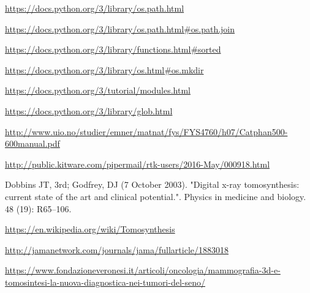 \documentclass[a4paper,12pt, doubleside]{report}
\begin{document}
\begin{thebibliography}{1}
        \url{https://docs.python.org/3/library/os.path.html}

        \url{https://docs.python.org/3/library/os.path.html#os.path.join}

        \url{https://docs.python.org/3/library/functions.html#sorted}    
        
        \url{https://docs.python.org/3/library/os.html#os.mkdir}

        \url{https://docs.python.org/3/tutorial/modules.html}

        \url{https://docs.python.org/3/library/glob.html}
    

        \url{http://www.uio.no/studier/emner/matnat/fys/FYS4760/h07/Catphan500-600manual.pdf}
        
        
        \url{http://public.kitware.com/pipermail/rtk-users/2016-May/000918.html}
            
        Dobbins JT, 3rd; Godfrey, DJ (7 October 2003). "Digital x-ray tomosynthesis: current state of the art and clinical potential.". Physics in medicine and biology. 48 (19): R65–106.
        
        \url{https://en.wikipedia.org/wiki/Tomosynthesis}
        
        \url{http://jamanetwork.com/journals/jama/fullarticle/1883018}
    
        \url{https://www.fondazioneveronesi.it/articoli/oncologia/mammografia-3d-e-tomosintesi-la-nuova-diagnostica-nei-tumori-del-seno/}
            
    \end{thebibliography}
\end{document}

